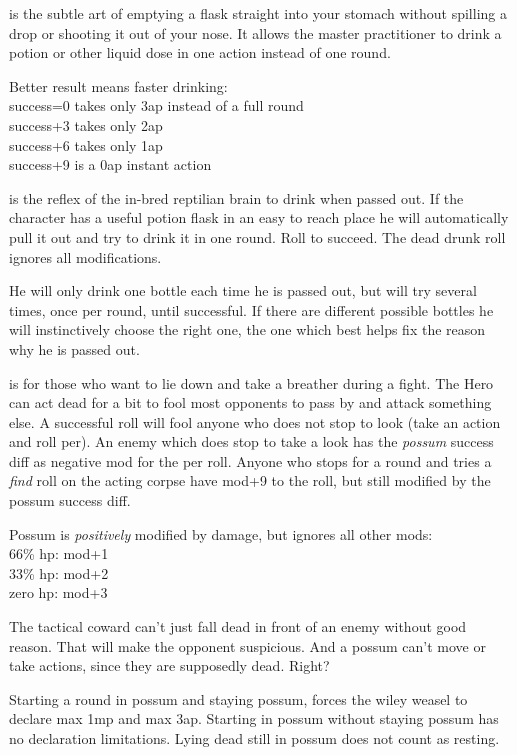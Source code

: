  is the subtle art of emptying a flask straight into your stomach without spilling a drop or shooting it out of your nose. It allows the master practitioner to drink a potion or other liquid dose in one action instead of one round.

Better result means faster drinking:\\
success=0 takes only 3ap instead of a full round\\
success+3 takes only 2ap\\
success+6 takes only 1ap\\
success+9 is a 0ap instant action


 is the reflex of the in-bred reptilian brain to drink when passed out. If the character has a useful potion flask in an easy to reach place he will automatically pull it out and try to drink it in one round. Roll to succeed. The dead drunk roll ignores all modifications.

He will only drink one bottle each time he is passed out, but will try several times, once per round, until successful. If there are different possible bottles he will instinctively choose the right one, the one which best helps fix the reason why he is passed out.


 is for those who want to lie down and take a breather during a fight. The Hero can act dead for a bit to fool most opponents to pass by and attack something else. A successful roll will fool anyone who does not stop to look (take an action and roll per). An enemy which does stop to take a look has the \emph{possum} success diff as negative mod for the per roll. Anyone who stops for a round and tries a \emph{find} roll on the acting corpse have mod+9 to the roll, but still modified by the possum success diff.

Possum is \emph{positively} modified by damage, but ignores all other mods:\\
66\% hp: mod+1\\
33\% hp: mod+2\\
zero hp: mod+3

The tactical coward can't just fall dead in front of an enemy without good reason. That will make the opponent suspicious. And a possum can't move or take actions, since they are supposedly dead. Right?

Starting a round in possum and staying possum, forces the wiley weasel to declare max 1mp and max 3ap. Starting in possum without staying possum has no declaration limitations. Lying dead still in possum does not count as resting.


